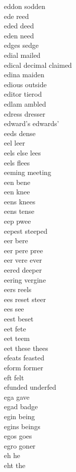 eddon sodden \\
ede reed \\
eded deed\\
eden need\\
edges sedge\\
edial mailed \\
edical decimal claimed \\
edina maiden \\
edious outside \\
editor tierod\\
edlam ambled \\
edress dresser \\
edward's edwards'\\
eeds dense \\
eel leer \\
eels else lees\\
eels flees \\
eeming meeting \\
een bene \\
een knee \\
eens knees \\
eens tense \\
eep pwee \\
eepest steeped \\
eer bere \\
eer pere pree \\
eer vere ever \\
eered deeper \\
eering vergine \\
eers reels \\
ees reset steer  \\
ees see\\
eest beset \\
eet fete \\
eet teem \\
eet these thees  \\
efeats feasted \\
eform former \\
eft felt \\
efunded underfed \\
ega gave \\
egad badge \\
egin being \\
egins beings \\
egos goes\\
egro goner \\
eh he\\
eht the\\
